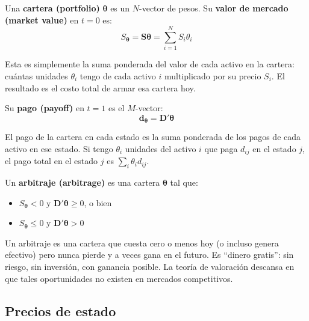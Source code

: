 \documentclass[12pt]{article}
\begin{document}
Una \textbf{cartera (portfolio)} $\boldsymbol{\theta}$ es un $N$-vector de pesos. Su \textbf{valor de mercado (market value)} en $t=0$ es:
\begin{equation}
    S_{\boldsymbol{\theta}} = \mathbf{S}\boldsymbol{\theta} = \sum_{i=1}^{N} S_i \theta_i
\end{equation}

\begin{intuicionmat}
Esta es simplemente la suma ponderada del valor de cada activo en la cartera: cu\'antas unidades $\theta_i$ tengo de cada activo $i$ multiplicado por su precio $S_i$. El resultado es el costo total de armar esa cartera hoy.
\end{intuicionmat}

Su \textbf{pago (payoff)} en $t=1$ es el $M$-vector:
\begin{equation}
    \mathbf{d}_{\boldsymbol{\theta}} = \mathbf{D}'\boldsymbol{\theta}
\end{equation}

\begin{intuicionmat}
El pago de la cartera en cada estado es la suma ponderada de los pagos de cada activo en ese estado. Si tengo $\theta_i$ unidades del activo $i$ que paga $d_{ij}$ en el estado $j$, el pago total en el estado $j$ es $\sum_i \theta_i d_{ij}$.
\end{intuicionmat}

Un \textbf{arbitraje (arbitrage)} es una cartera $\boldsymbol{\theta}$ tal que:
\begin{itemize}
    \item $S_{\boldsymbol{\theta}} < 0$ y $\mathbf{D}'\boldsymbol{\theta} \geq 0$, o bien
    \item $S_{\boldsymbol{\theta}} \leq 0$ y $\mathbf{D}'\boldsymbol{\theta} > 0$
\end{itemize}

\begin{intuicion}
Un arbitraje es una cartera que cuesta cero o menos hoy (o incluso genera efectivo) pero nunca pierde y a veces gana en el futuro. Es ``dinero gratis'': sin riesgo, sin inversi\'on, con ganancia posible. La teor\'ia de valoraci\'on descansa en que tales oportunidades no existen en mercados competitivos.
\end{intuicion}

\subsection{Precios de estado}
\end{document}
